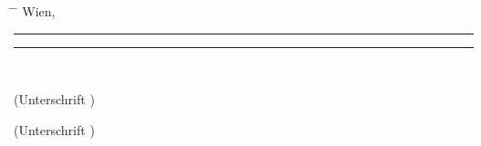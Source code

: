 \begin{center}
\begin{minipage}[t][1.5cm][t]{\textwidth}%
  \vspace{0pt}\sffamily\thesistitlefontnormalsize
  \begin{tabbing}%
    \hspace{45mm} \= \hspace{63mm} \= \hspace{51mm} \kill
    Wien, \tuinfthesisdate \> {\raggedright\rule{51mm}{0.5pt}} \> {\raggedright\rule{51mm}{0.5pt}} \\
    \> \begin{minipage}[t][0.5cm][t]{51mm}\centering (Unterschrift \tuinfthesisverfassung)\end{minipage}
    \> \begin{minipage}[t][0.5cm][t]{51mm}\centering (Unterschrift \tuinfthesisbetreuung)\end{minipage}
    \end{tabbing}
\end{minipage}

\end{center}

\pagestyle{empty}
\cleardoublepage


\setlength{\baselineskip}{\tmpbaselineskip}
\setlength{\parindent}{\tmpparindent}

\restoregeometry


